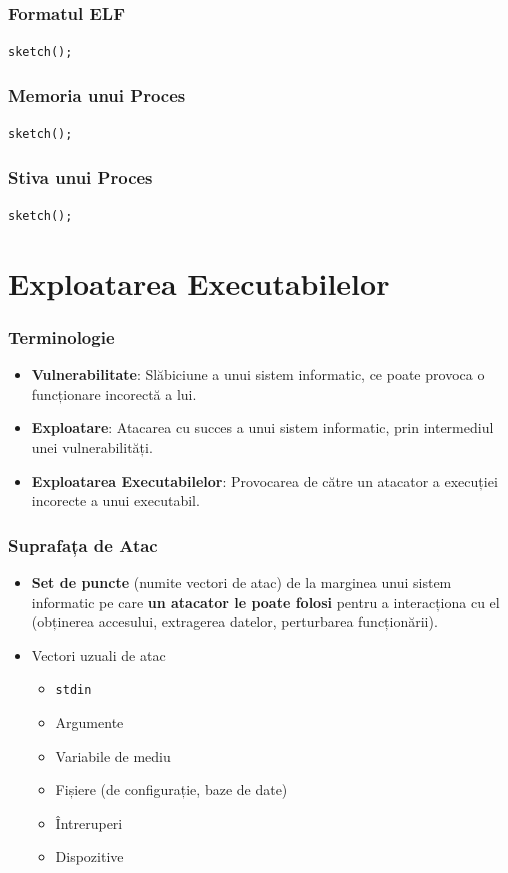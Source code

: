 \documentclass[xcolor={table}]{beamer}
\begin{document}
	\begin{frame}
		\frametitle{Formatul ELF}\pause
        \centering
        \texttt{sketch();}
	\end{frame}
	
	\begin{frame}
		\frametitle{Memoria unui Proces}\pause
		\centering
        \texttt{sketch();}
	\end{frame}
	
	\begin{frame}
		\frametitle{Stiva unui Proces}\pause
		\centering
        \texttt{sketch();}
	\end{frame}
	
	\section{Exploatarea Executabilelor}
	
	\begin{frame}
		\frametitle{Terminologie}\pause
		\begin{itemize}[<+->]
		    \item \textbf{Vulnerabilitate}: Slăbiciune a unui sistem informatic, ce poate provoca o funcționare incorectă a lui.
			\item \textbf{Exploatare}: Atacarea cu succes a unui sistem informatic, prin intermediul unei vulnerabilități.
		    \item \textbf{Exploatarea Executabilelor}: Provocarea de către un atacator a execuției incorecte a unui executabil.
		\end{itemize}
	\end{frame}
	
	\begin{frame}
		\frametitle{Suprafața de Atac}\pause
		\begin{itemize}[<+->]
		    \item \textbf{Set de puncte} (numite vectori de atac) de la marginea unui sistem informatic  pe care \textbf{un atacator le poate folosi} pentru a interacționa cu el (obținerea accesului, extragerea datelor, perturbarea funcționării).
		    \item Vectori uzuali de atac
    		    \begin{itemize}
        		    \item \texttt{stdin}
        		    \item Argumente
        		    \item Variabile de mediu
        		    \item Fișiere (de configurație, baze de date)
        		    \item Întreruperi
        		    \item Dispozitive
    		    \end{itemize}
		\end{itemize}
	\end{frame}
	
\end{document}
